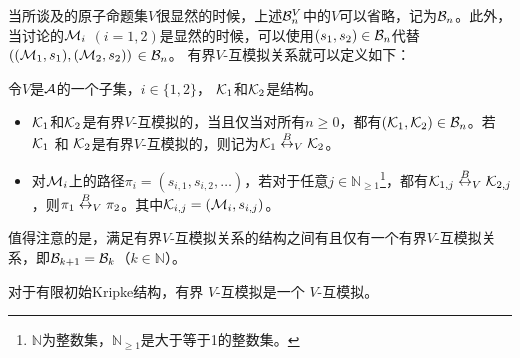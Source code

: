 当所谈及的原子命题集$V$很显然的时候，上述${\cal B}_n^V$中的$V$可以省略，记为${\cal B}_n$。此外，当讨论的${\cal M}_i$ $(i=1,2)$是显然的时候，可以使用$(s_1,s_2) \in {\cal B}_n$代替$(({\cal M}_1,s_1),({\cal M}_2,s_2))$ $\in {\cal B}_n$。
有界$V$-互模拟关系就可以定义如下：
\begin{definition}[有界$V$-互模拟]\label{def:V-bisimulation}
	令$V$是${\cal A}$的一个子集，$i\in \{1,2\}$， ${\cal K}_1$和${\cal K}_2$是结构。
	\begin{itemize}
		\item ${\cal K}_1$和${\cal K}_2$是有界$V$-互模拟的，当且仅当对所有$n \ge 0$，都有$({\cal K}_1, {\cal K}_2)\in {\cal B}_n$。若 ${\cal K}_1$ 和 ${\cal K}_2$是有界$V$-互模拟的，则记为${\cal K}_1 \overset{B}{\leftrightarrow}_V {\cal K}_2$。
		\item 对${\cal M}_i$上的路径$\pi_i=(s_{i,1},s_{i,2},\dots)$，若对于任意$j\in \mathbb{N}_{\ge 1}$\footnote{$\mathbb{N}$为整数集，$\mathbb{N}_{\ge 1}$是大于等于1的整数集。}，都有${\cal K}_{1,j} \overset{B}{\leftrightarrow}_V {\cal K}_{2,j}$，则$\pi_1 \overset{B}{\leftrightarrow}_V \pi_2$。其中${\cal K}_{i, j}=({\cal M}_i, s_{i,j})$。
	\end{itemize}
\end{definition}

值得注意的是，满足有界$V$-互模拟关系的结构之间有且仅有一个有界$V$-互模拟关系，即${\cal B}_{k+1} = {\cal B}_k$（$k \in \mathbb{N}$）。


\begin{lemma} \label{lem:HbBis}
	对于有限初始Kripke结构，有界 $V$-互模拟是一个 $V$-互模拟。
\end{lemma}

